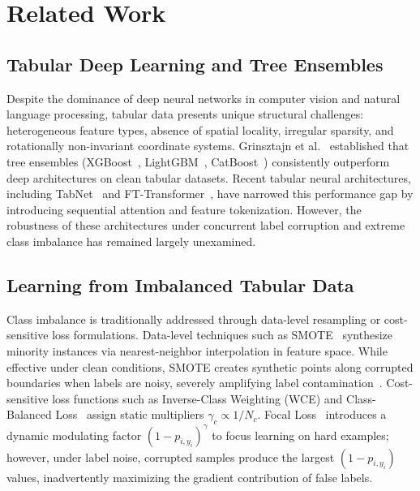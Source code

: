 \documentclass[preprint,12pt]{elsarticle}
\begin{document}
\section{Related Work}
\label{sec:related}

\subsection{Tabular Deep Learning and Tree Ensembles}
Despite the dominance of deep neural networks in computer vision and natural language processing, tabular data presents unique structural challenges: heterogeneous feature types, absence of spatial locality, irregular sparsity, and rotationally non-invariant coordinate systems. Grinsztajn et al.~\cite{grinsztajn2022why} established that tree ensembles (XGBoost~\cite{chen2016xgboost}, LightGBM~\cite{ke2017lightgbm}, CatBoost~\cite{prokhorenkova2018catboost}) consistently outperform deep architectures on clean tabular datasets. Recent tabular neural architectures, including TabNet~\cite{arik2021tabnet} and FT-Transformer~\cite{gorishniy2021revisiting}, have narrowed this performance gap by introducing sequential attention and feature tokenization. However, the robustness of these architectures under concurrent label corruption and extreme class imbalance has remained largely unexamined.

\subsection{Learning from Imbalanced Tabular Data}
Class imbalance is traditionally addressed through data-level resampling or cost-sensitive loss formulations. Data-level techniques such as SMOTE~\cite{chawla2002smote} synthesize minority instances via nearest-neighbor interpolation in feature space. While effective under clean conditions, SMOTE creates synthetic points along corrupted boundaries when labels are noisy, severely amplifying label contamination~\cite{he2009learning,lemaitre2017imbalanced}. Cost-sensitive loss functions such as Inverse-Class Weighting (WCE) and Class-Balanced Loss~\cite{cui2019class} assign static multipliers $\gamma_c \propto 1/N_c$. Focal Loss~\cite{lin2017focal} introduces a dynamic modulating factor $(1 - p_{i, y_i})^\gamma$ to focus learning on hard examples; however, under label noise, corrupted samples produce the largest $(1 - p_{i, y_i})$ values, inadvertently maximizing the gradient contribution of false labels.
\end{document}

